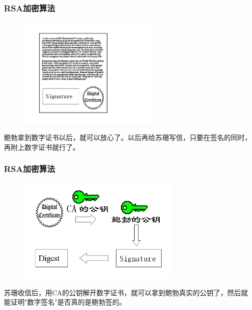 \documentclass[slidestop,compress,mathserif]{beamer}
\begin{document}
\begin{frame}
  \transboxout
  \frametitle{RSA加密算法}
  \begin{center}
    \begin{figure}
      \includegraphics[width=7cm]{bg12}
    \end{figure}
    鲍勃拿到数字证书以后，就可以放心了。以后再给苏珊写信，只要在签名的同时，再附上数字证书就行了。
  \end{center}
\end{frame}

\begin{frame}
  \transboxout
  \frametitle{RSA加密算法}
  \begin{center}
    \begin{figure}
      \includegraphics[width=8cm]{bg13}
    \end{figure}
    苏珊收信后，用CA的公钥解开数字证书，就可以拿到鲍勃真实的公钥了，然后就能证明"数字签名"是否真的是鲍勃签的。
  \end{center}
\end{frame}



\end{document}
